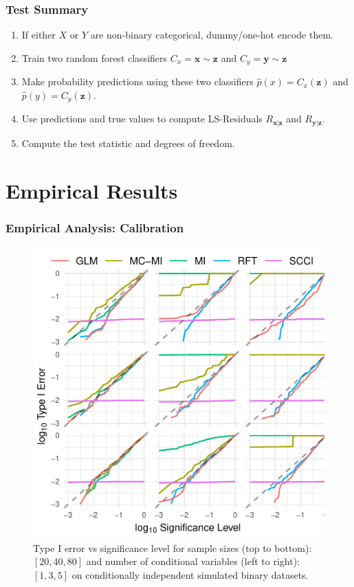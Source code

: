 \documentclass{beamer}
\begin{document}
\begin{frame}
	\frametitle{Test Summary}
	\begin{enumerate}
		\setlength\itemsep{1em}
		\item If either $ X $ or $ Y $ are non-binary categorical,
			dummy/one-hot encode them.
		\item Train two random forest classifiers $ C_x = \bm{x} \sim \bm{z} $ and
			$ C_y = \bm{y} \sim \bm{z} $
		\item Make probability predictions using these two classifiers
			$ \hat{p}(x) = C_x(\bm{z}) $ and $ \hat{p}(y) =
			C_y(\bm{\bm{z}}) $.
		\item Use predictions and true values to compute LS-Residuals $ R_{\bm{x}|\bm{z}} $ and $ R_{\bm{y}|\bm{z}} $.	
		\item Compute the test statistic and degrees of freedom.
	\end{enumerate}
\end{frame}

\section{Empirical Results}

\begin{frame}
	\frametitle{Empirical Analysis: Calibration}
	\begin{figure}
		\centering
		\includegraphics[scale=0.8]{imgs/calibration_add_vars.pdf}
		\caption*{Type I error vs significance level for sample sizes (top to
		bottom): $ [20, 40, 80] $ and number of conditional variables (left to
		right): $ [1, 3, 5] $ on conditionally independent simulated binary
		datasets.}
	\end{figure}
\end{frame}
\end{document}

